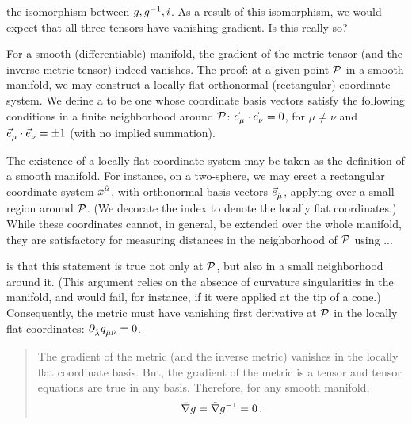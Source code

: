  the isomorphism between $g,{g}^{-1},i$. As a result of this isomorphism, we would expect that all three tensors have vanishing gradient. Is this really so?

 For a smooth (differentiable) manifold, the gradient of the metric tensor (and the inverse metric tensor) indeed vanishes. The proof: at a given point $\mathcal{P}$ in a smooth manifold, we may construct a locally flat orthonormal (rectangular) coordinate system. We define a  to be one whose coordinate basis vectors satisfy the following conditions in a finite neighborhood around $\mathcal{P}$: $\tbvec\mu\iprod\tbvec\nu = 0$, for $\mu\neq\nu$ and $\tbvec\mu\iprod\tbvec\nu = \pm 1$ (with no implied summation).

 The existence of a locally flat coordinate system may be taken as the definition of a smooth manifold. For instance, on a two-sphere, we may erect a rectangular coordinate system $\tvec\pos{\ridx\mu}$, with orthonormal basis vectors $\tbvec{\ridx\mu}$, applying over a small region around $\mathcal{P}$. (We decorate the index to denote the locally flat coordinates.) While these coordinates cannot, in general, be extended over the whole manifold, they are satisfactory for measuring distances in the neighborhood of $\mathcal{P}$ using ...

 is that this statement is true not only at $\mathcal{P}$, but also in a small neighborhood around it. (This argument relies on the absence of curvature singularities in the manifold, and would fail, for instance, if it were applied at the tip of a cone.) Consequently, the metric must have vanishing first derivative at $\mathcal{P}$ in the locally flat coordinates: $\ipd{\ridx\lambda}\tmetric{\ridx\mu}{\ridx\nu} = 0$.
%
\begin{quotation}
   The gradient of the metric (and the inverse metric) vanishes in the locally flat coordinate basis. But, the gradient of the metric is a tensor and tensor equations are true in any basis. Therefore, for any smooth manifold,
  \begin{equation}\label{eq:gradientofthemetricvanishes}
    \tilde{\nabla}g = \tilde{\nabla}{g}^{-1} = 0\,.
  \end{equation}
\end{quotation}


